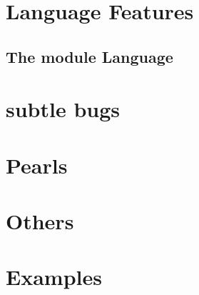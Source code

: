 
\chapter{Language Features}
  \label{sec:compl-lang-feat}
  
  
  
  
  
  
  

\section{The module Language}
  \label{sec:module-language}

\chapter{subtle bugs}
  \label{sec:subtle-bugs}
  
  
  
  


\chapter{Pearls}
  
  
  


\chapter{Others}
  
  
  
\chapter{Examples}
  
  



